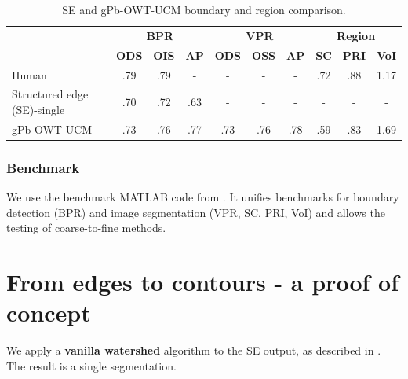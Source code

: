 \begin{table}[htbp]
\renewcommand{\arraystretch}{1.3}
\centering
\scriptsize
\begin{tabular}{l|c|c|c||c|c|c||c|c|c|}
\cline{2-10} %
\multirow{2}{*}{} & \multicolumn{3}{c||}{\textbf{BPR}} & \multicolumn{3}{c||}{\textbf{VPR}}& \multicolumn{3}{c|}{\textbf{Region}}\\
\cline{2-10}
& \textbf{ODS}  & \textbf{OIS} & \textbf{AP} %
& \textbf{ODS} & \textbf{OSS} & \textbf{AP} %
& \textbf{SC} & \textbf{PRI} & \textbf{VoI} \\
\hline
\multicolumn{1}{|l|}{Human} & .79 & .79 & - & - & - & - & .72 & .88 & 1.17 \\ %
\hline
\hline
\multicolumn{1}{|l|}{\cite{DollarICCV13edges} Structured edge (SE)-single} & .70 & .72 & .63 & - & - & - & - & - & - \\
\hline
\multicolumn{1}{|l|}{\cite{Arbelaez11} gPb-OWT-UCM} & .73 & .76 & .77 & .73 & .76 & .78 & .59 & .83 & 1.69 \\
\hline
\end{tabular}
\caption[SE and gPb-OWT-UCM boundary and region comparison]{SE and gPb-OWT-UCM boundary and region comparison.}
\label{tab:SE_vs_gPb_OWT_UCM}
\end{table}

\subsubsection{Benchmark}
We use the benchmark MATLAB code from \cite{Galasso13Benchmark}. %
It unifies benchmarks for boundary detection (BPR) and image segmentation (VPR, SC, %
PRI, VoI) and allows the testing of coarse-to-fine methods. %

\section{From edges to contours - a proof of concept}
We apply a {\bf vanilla watershed} algorithm \cite{Beucher1992morphological,Najman1996geodesic,PINKlibrary} to the SE output, as described in . The result is a single segmentation. 

